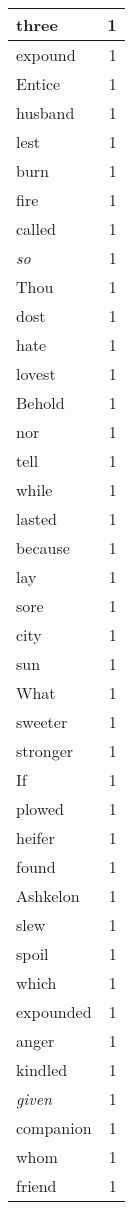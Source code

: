 \begin{center}
\begin{longtable}{l|r}
three & 1\\ \hline 
expound & 1\\ \hline 
Entice & 1\\ \hline 
husband & 1\\ \hline 
lest & 1\\ \hline 
burn & 1\\ \hline 
fire & 1\\ \hline 
called & 1\\ \hline 
\emph{so} & 1\\ \hline 
Thou & 1\\ \hline 
dost & 1\\ \hline 
hate & 1\\ \hline 
lovest & 1\\ \hline 
Behold & 1\\ \hline 
nor & 1\\ \hline 
tell & 1\\ \hline 
while & 1\\ \hline 
lasted & 1\\ \hline 
because & 1\\ \hline 
lay & 1\\ \hline 
sore & 1\\ \hline 
city & 1\\ \hline 
sun & 1\\ \hline 
What & 1\\ \hline 
sweeter & 1\\ \hline 
stronger & 1\\ \hline 
If & 1\\ \hline 
plowed & 1\\ \hline 
heifer & 1\\ \hline 
found & 1\\ \hline 
Ashkelon & 1\\ \hline 
slew & 1\\ \hline 
spoil & 1\\ \hline 
which & 1\\ \hline 
expounded & 1\\ \hline 
anger & 1\\ \hline 
kindled & 1\\ \hline 
\emph{given} & 1\\ \hline 
companion & 1\\ \hline 
whom & 1\\ \hline 
friend & 1\\ \hline 
\end{longtable}
\end{center}



